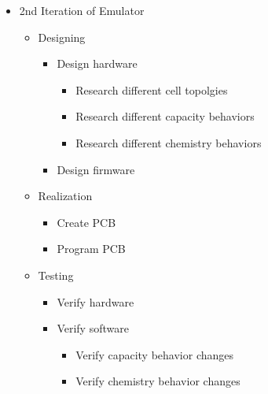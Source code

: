\begin{itemize}
    \item 2nd Iteration of Emulator
    \begin{itemize}
        \item Designing 
        \begin{itemize}
            \item Design hardware
            \begin{itemize}
                \item Research different cell topolgies 
                \item Research different capacity behaviors 
                \item Research different chemistry behaviors
            \end{itemize}
            \item Design firmware
        \end{itemize}
        \item Realization
        \begin{itemize}
        \item Create PCB
        \item Program PCB
        \end{itemize}
        \item Testing
        \begin{itemize}
            \item Verify hardware
            \item Verify software 
            \begin{itemize}
                \item Verify capacity behavior changes
                \item Verify chemistry behavior changes
            \end{itemize}
        \end{itemize}
    \end{itemize}


\end{itemize}
